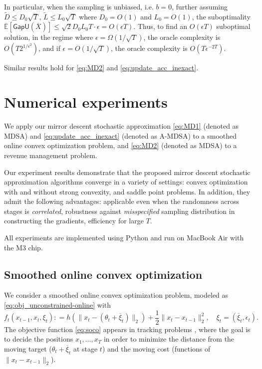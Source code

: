 \documentclass[11pt,fullpage,letterpaper]{article}
\newcommand{\E}{\mathbb{E}}
\newcommand{\gapu}{\mathsf{GapU}}
\begin{document}
In particular, when the sampling is unbiased, i.e. $b = 0$, further assuming $\tilde{D} \leq D_0\sqrt{T}$, $\tilde{L} \leq L_0\sqrt{T}$ where $D_0 = O(1)$ and $L_0 = O(1)$, the suboptimality $\overline{\E}[\gapu(\overline{X})]\leq \sqrt{2}D_0L_0T\cdot \epsilon = O(\epsilon T)$. Thus, to find an $O(\epsilon T)$ suboptimal solution, in the regime where $\epsilon = \Omega(1/\sqrt{T})$, the oracle complexity is $O(T2^{1/\epsilon^2})$, and if $\epsilon = O(1/\sqrt{T})$, the oracle complexity is $O(T\epsilon^{-2T})$.



Similar results hold for \eqref{eq:MD2} and \eqref{eq:update_acc_inexact}. 




\section{Numerical experiments}\label{sec:num_exp}


We apply our mirror descent stochastic approximation \eqref{eq:MD1} (denoted as MDSA) and \eqref{eq:update_acc_inexact} (denoted as A-MDSA) to a smoothed online convex optimization problem, and \eqref{eq:MD2} (denoted as MDSA) to a revenue management problem. 

Our experiment results demonstrate that the proposed mirror descent stochastic approximation algorithms converge in a variety of settings: convex optimization with and without strong convexity, and saddle point problems. In addition, they admit the following advantages: applicable even when the randomness across stages is \textit{correlated}, robustness against \textit{misspecified} sampling distribution in constructing the gradients, efficiency for large $T$.



All experiments are implemented using Python and run on MacBook Air with the M3 chip. 


\subsection{Smoothed online convex optimization}\label{sec:exp-soco-gen}
We consider a smoothed online convex optimization problem, modeled as \eqref{eq:obj_unconstrained-online} with
\begin{equation}\label{eq:soco}
     f_t(x_{t-1},x_t,\xi_t): = h(\|x_t - (\theta_t+\overline{\xi}_t)\|_2) + \frac{1}{2} \|x_t - x_{t-1}\|_2^2,\quad \xi_t = (\overline{\xi}_t,\epsilon_t).
\end{equation}
The objective function \eqref{eq:soco} appears in tracking problems \cite{LiLi2020}, where the goal is to decide the positions $x_1,\ldots,x_T$ in order to minimize the distance from the moving target ($\theta_t + \overline{\xi}_t$ at stage $t$) and the moving cost (functions of $\|x_{t}-x_{t-1}\|_2$). 
\end{document}
